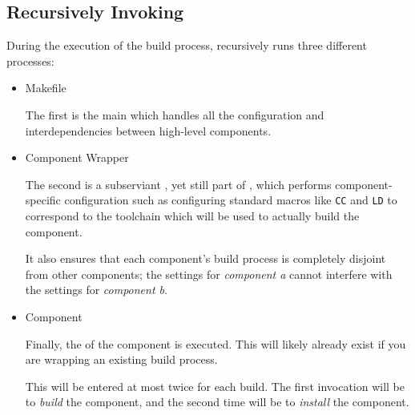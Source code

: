 \subsection{Recursively Invoking \make}

During the execution of the build process, \lmsbw recursively runs
three different \makefile processes:

\begin{itemize}
\item \lmsbw Makefile

  The first is the main \lmsbw \makefile which handles all the
  configuration and interdependencies between high-level components.

\item Component Wrapper \makefile

  The second is a subserviant \makefile, yet still part of \lmsbw,
  which performs component-specific configuration such as configuring
  standard \makefile macros like \texttt{CC} and \texttt{LD} to
  correspond to the toolchain which will be used to actually build the
  component.

  It also ensures that each component's build process is completely
  disjoint from other components; the settings for \emph{component a}
  cannot interfere with the settings for \emph{component b}.

\item Component \makefile

  Finally, the \makefile of the component is executed.  This will
  likely already exist if you are wrapping an existing build process.

  This \makefile will be entered at most twice for each build.  The
  first invocation will be to \emph{build} the component, and the
  second time will be to \emph{install} the component.
\end{itemize}
